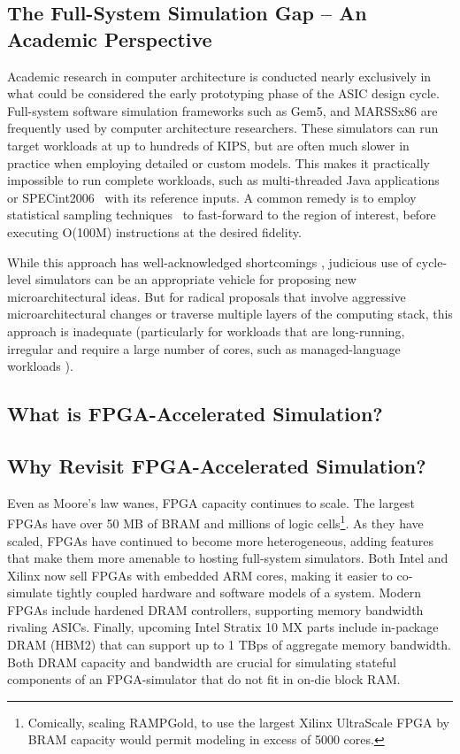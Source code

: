\subsection{The Full-System Simulation Gap -- An Academic Perspective}

Academic research in computer architecture is conducted nearly exclusively in
what could be considered the early prototyping phase of the ASIC design cycle.
Full-system software simulation frameworks such as Gem5\cite{gem5}, and
MARSSx86\cite{marssx86} are frequently used by computer architecture
researchers. These simulators can run target workloads at up to hundreds of
KIPS, but are often much slower in practice when employing detailed or custom
models. This makes it practically impossible to run complete workloads, such as
multi-threaded Java applications or SPECint2006~\cite{spec} with its reference
inputs. A common remedy is to employ statistical sampling
techniques~\cite{smarts} to fast-forward to the region of interest, before
executing O(100M) instructions at the desired fidelity.

While this approach has well-acknowledged shortcomings \cite{gem5error},
judicious use of cycle-level simulators can be an appropriate vehicle for
proposing new microarchitectural ideas. But for radical proposals that involve
aggressive microarchitectural changes or traverse multiple layers of the
computing stack, this approach is inadequate (particularly for workloads that
are long-running, irregular and require a large number of cores, such as
managed-language workloads \cite{MicroSimPanel}).

\subsection{What is FPGA-Accelerated Simulation?}




\subsection{Why Revisit FPGA-Accelerated Simulation?}

Even as Moore's law wanes, FPGA capacity continues to scale. The largest FPGAs
have over 50 MB of BRAM and millions of logic cells\footnote{Comically, scaling
RAMPGold\cite{rampgold}, to use the largest Xilinx UltraScale
FPGA\cite{ultrascale} by BRAM capacity would permit modeling in excess of 5000
cores.}. As they have scaled, FPGAs have continued to become more
heterogeneous, adding features that make them more amenable to hosting
full-system simulators.  Both Intel and Xilinx now sell FPGAs with embedded ARM
cores, making it easier to co-simulate tightly coupled hardware and software
models of a system. Modern FPGAs include hardened DRAM controllers, supporting
memory bandwidth rivaling ASICs. Finally, upcoming Intel Stratix 10 MX parts
include in-package DRAM (HBM2) that can support up to 1 TBps of aggregate
memory bandwidth\cite{stratix10mx}. Both DRAM capacity and bandwidth are
crucial for simulating stateful components of an FPGA-simulator that do not fit
in on-die block RAM.

